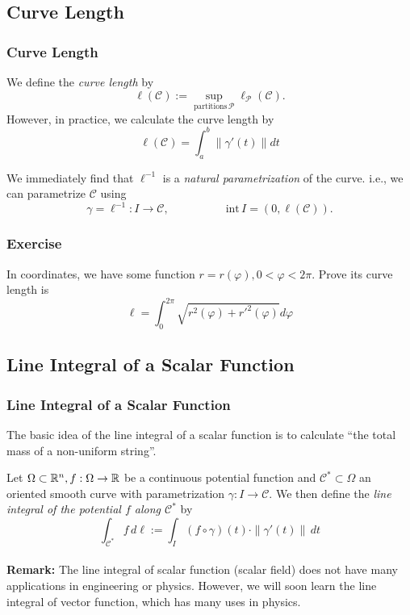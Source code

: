 \documentclass[12pt, t]{beamer}
\renewcommand{\emph}[1]{{\color{Turquoise3}\textsl{#1}}}
\newcommand{\nullspace}{~\\[15pt]}
\newcommand{\Remark}{\textbf{Remark: }}
\begin{document}
\subsection{Curve Length}
\begin{frame}
    \frametitle{Curve Length}

    We define the \emph{curve length} by
    \[\ell(\mathcal{C}):=\sup\limits_{\text{partitions}\,\mathcal{P}}\ell_\mathcal{P}(\mathcal{C}).\]
    However, in practice, we calculate the curve length by
    \[\ell(\mathcal{C})=\int_{a}^{b}\|\gamma'(t)\|dt\]

    We immediately find that $\ell^{-1}$ is a \emph{natural parametrization} of the curve. i.e., we can
    parametrize $\mathcal{C}$ using
    \[\gamma=\ell^{-1}:I\to\mathcal{C},\qquad
        \qquad\quad\text{int}\,I=(0,\ell(\mathcal{C})).\]
\end{frame}

\begin{frame}
    \frametitle{Exercise}
    In coordinates, we have some function $r=r(\varphi),0<\varphi<2\pi$. Prove its curve length is
    $$
        \ell = \int_0^{2\pi}\sqrt{r^2(\varphi)+r'^2(\varphi)}d\varphi
    $$



\end{frame}

\subsection{Line Integral of a Scalar Function}
\begin{frame}
    \frametitle{Line Integral of a Scalar Function}
    The basic idea of the line integral of a scalar function is to calculate ``the total mass of a non-uniform string''.

    Let $\Omega\subset\mathbb{R}^n,f:\Omega\to\mathbb{R}$ be a continuous potential function and $\mathcal{C}^*\subset\Omega$ an oriented smooth curve with parametrization $\gamma:I\to\mathcal{C}$. We then define the \emph{line integral of the potential $f$ along $\mathcal{C}^*$} by
    \[\int_{\mathcal{C}^*}f\,d\ell:=\int_{I}(f\circ\gamma)(t)
        \cdot\|\gamma'(t)\|\,dt\]
    \nullspace
    \Remark The line integral of scalar function (scalar field) does not have many applications in engineering or physics. However, we will soon learn the line integral of vector function, which has many uses in physics.
\end{frame}
\end{document}
